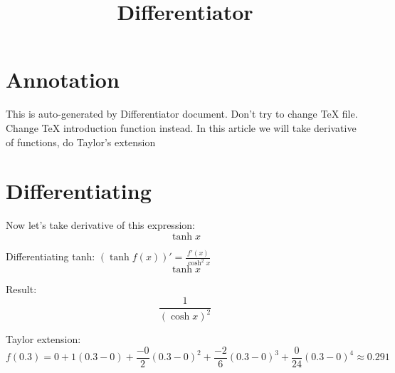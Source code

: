 \documentclass{article}
\title{\textbf{Differentiator}}
\date{}
\author{\text{Котляров Михаил, Б01-402}}
\begin{document}
\maketitle
\section*{Annotation}
This is auto-generated by Differentiator document. Don't try to change TeX file. Change TeX introduction function instead.
In this article we will take derivative of functions, do Taylor's extension
\section*{Differentiating}
Now let's take derivative of this expression: 
\[\tanh{x}\]


Differentiating tanh: $(\tanh{f(x)})' = \frac{f'(x)} {{\cosh^{2}x}}$
\[\tanh{x}\]

 Result: 
\[\frac{1} {{(\cosh{x})}^{2}}\]


Taylor extension: 
\[ f(0.3) = 0 + {1} {({0.3} - {0})} + \frac{-0} {2}({0.3} - {0})^2 + \frac{-2} {6}({0.3} - {0})^3 + \frac{0} {24}({0.3} - {0})^4 \stackrel{}{\approx} 0.291\]
\end{document}

